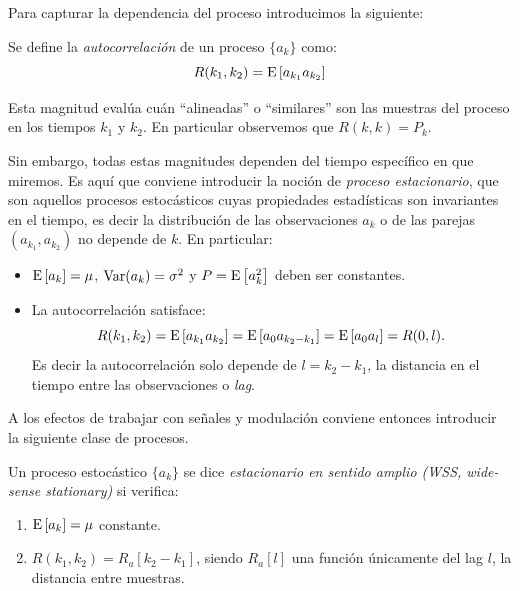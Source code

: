 Para capturar la dependencia del proceso introducimos la siguiente:
\begin{definicion}\label{def:autocorrelacion_noest_td}
    Se define la \emph{autocorrelación} de un proceso $\{a_k\}$ como:
    \begin{equation*}
        R(k_1,k_2) = \mathrm{E}\left[a_{k_1}a_{k_2}\right]
    \end{equation*}
\end{definicion}
Esta magnitud evalúa cuán ``alineadas'' o ``similares'' son las muestras del proceso en los tiempos $k_1$ y $k_2$. En particular observemos que $R(k,k)=P_k$.

Sin embargo, todas estas magnitudes dependen del tiempo específico en que miremos. Es aquí que conviene introducir la noción de \emph{proceso estacionario}, que son aquellos procesos estocásticos cuyas propiedades estadísticas son invariantes en el tiempo, es decir la distribución de las observaciones $a_k$ o de las parejas $(a_{k_1},a_{k_2})$ no depende de $k$. En particular:
\begin{itemize}
    \item $\mathrm{E}\left[a_k\right] = \mu$, $\operatorname{Var}(a_k)=\sigma^2$ y $P=\mathrm{E}\left[a_k^2\right]$ deben ser constantes.
    \item La autocorrelación satisface:
       \begin{equation*}
        R(k_1,k_2) = \mathrm{E}\left[a_{k_1}a_{k_2}\right] = \mathrm{E}\left[a_{0}a_{k_2-k_1}\right] = \mathrm{E}\left[a_{0}a_{l}\right] = R(0,l).
       \end{equation*}
       Es decir la autocorrelación solo depende de $l=k_2-k_1$, la distancia en el tiempo entre las observaciones o \emph{lag}.
\end{itemize}

A los efectos de trabajar con señales y modulación conviene entonces introducir la siguiente clase de procesos.
\begin{definicion}
    Un proceso estocástico $\{a_k\}$ se dice \emph{estacionario en sentido amplio (WSS, wide-sense stationary)} si verifica:
    \begin{enumerate}
        \item $\mathrm{E}\left[a_k\right] = \mu$ constante.
        \item $R(k_1,k_2) = R_a[k_2-k_1]$, siendo $R_a[l]$ una función únicamente del lag $l$, la distancia entre muestras.
    \end{enumerate}
\end{definicion}

